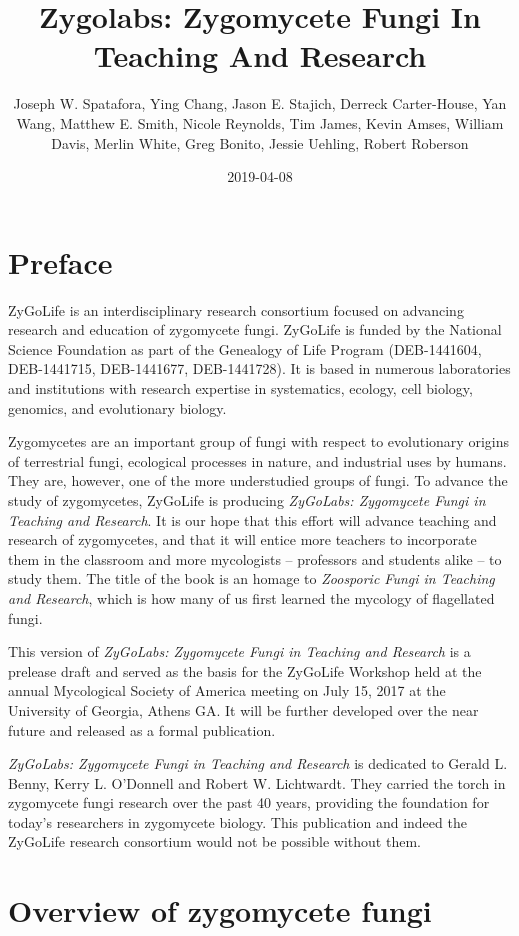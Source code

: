 \documentclass[]{book}
\title{Zygolabs: Zygomycete Fungi In Teaching And Research}
\author{Joseph W. Spatafora, Ying Chang, Jason E. Stajich, Derreck Carter-House,
Yan Wang, Matthew E. Smith, Nicole Reynolds, Tim James, Kevin Amses,
William Davis, Merlin White, Greg Bonito, Jessie Uehling, Robert
Roberson}
\date{2019-04-08}
\begin{document}
\maketitle

{
\setcounter{tocdepth}{1}
\tableofcontents
}
\chapter*{Preface}\label{preface}

ZyGoLife is an interdisciplinary research consortium focused on
advancing research and education of zygomycete fungi. ZyGoLife is funded
by the National Science Foundation as part of the Genealogy of Life
Program (DEB-1441604, DEB-1441715, DEB-1441677, DEB-1441728). It is
based in numerous laboratories and institutions with research expertise
in systematics, ecology, cell biology, genomics, and evolutionary
biology.

Zygomycetes are an important group of fungi with respect to evolutionary
origins of terrestrial fungi, ecological processes in nature, and
industrial uses by humans. They are, however, one of the more
understudied groups of fungi. To advance the study of zygomycetes,
ZyGoLife is producing \emph{ZyGoLabs: Zygomycete Fungi in Teaching and
Research}. It is our hope that this effort will advance teaching and
research of zygomycetes, and that it will entice more teachers to
incorporate them in the classroom and more mycologists -- professors and
students alike -- to study them. The title of the book is an homage to
\emph{Zoosporic Fungi in Teaching and Research}, which is how many of us
first learned the mycology of flagellated fungi.

This version of \emph{ZyGoLabs: Zygomycete Fungi in Teaching and
Research} is a prelease draft and served as the basis for the ZyGoLife
Workshop held at the annual Mycological Society of America meeting on
July 15, 2017 at the University of Georgia, Athens GA. It will be
further developed over the near future and released as a formal
publication.

\emph{ZyGoLabs: Zygomycete Fungi in Teaching and Research} is dedicated
to Gerald L. Benny, Kerry L. O'Donnell and Robert W. Lichtwardt. They
carried the torch in zygomycete fungi research over the past 40 years,
providing the foundation for today's researchers in zygomycete biology.
This publication and indeed the ZyGoLife research consortium would not
be possible without them.

\chapter{Overview of zygomycete fungi}\label{intro}
\end{document}

